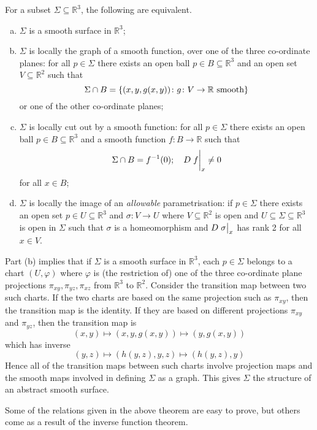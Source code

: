 \begin{theorem}
	For a subset \( \Sigma \subseteq \mathbb R^3 \), the following are equivalent.
	\begin{enumerate}[(a)]
		\item \( \Sigma \) is a smooth surface in \( \mathbb R^3 \);
		\item \( \Sigma \) is locally the graph of a smooth function, over one of the three co-ordinate planes: for all \( p \in \Sigma \) there exists an open ball \( p \in B \subseteq \mathbb R^3 \) and an open set \( V \subseteq \mathbb R^2 \) such that
			\[ \Sigma \cap B = \qty{(x, y, g(x,y)) \colon g \colon V \to \mathbb R \text{ smooth}} \]
			or one of the other co-ordinate planes;
		\item \( \Sigma \) is locally cut out by a smooth function: for all \( p \in \Sigma \) there exists an open ball \( p \in B \subseteq \mathbb R^3 \) and a smooth function \( f \colon B \to \mathbb R \) such that
			\[ \Sigma \cap B = f^{-1}(0);\quad D \eval{f}_x \neq 0 \]
			for all \( x \in B \);
		\item \( \Sigma \) is locally the image of an \textit{allowable} parametrisation: if \( p \in \Sigma \) there exists an open set \( p \in U \subseteq \mathbb R^3 \) and \( \sigma \colon V \to U \) where \( V \subseteq \mathbb R^2 \) is open and \( U \subseteq \Sigma \subseteq \mathbb R^3 \) is open in \( \Sigma \) such that \( \sigma \) is a homeomorphism and \( D \eval{\sigma}_x \) has rank 2 for all \( x \in V \).
	\end{enumerate}
\end{theorem}
\begin{remark}
	Part (b) implies that if \( \Sigma \) is a smooth surface in \( \mathbb R^3 \), each \( p \in \Sigma \) belongs to a chart \( (U, \varphi) \) where \( \varphi \) is (the restriction of) one of the three co-ordinate plane projections \( \pi_{xy}, \pi_{yz}, \pi_{xz} \) from \( \mathbb R^3 \) to \( \mathbb R^2 \).
	Consider the transition map between two such charts.
	If the two charts are based on the same projection such as \( \pi_{xy} \), then the transition map is the identity.
	If they are based on different projections \( \pi_{xy} \) and \( \pi_{yz} \), then the transition map is
	\[ (x,y) \mapsto (x,y,g(x,y)) \mapsto (y,g(x,y)) \]
	which has inverse
	\[ (y,z) \mapsto (h(y,z),y,z) \mapsto (h(y,z),y) \]
	Hence all of the transition maps between such charts involve projection maps and the smooth maps involved in defining \( \Sigma \) as a graph.
	This gives \( \Sigma \) the structure of an abstract smooth surface.
\end{remark}
Some of the relations given in the above theorem are easy to prove, but others come as a result of the inverse function theorem.

